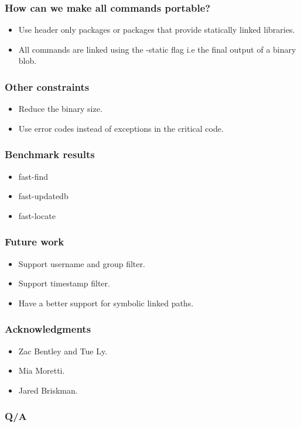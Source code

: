 \documentclass[bigger]{beamer}
\begin{document}
\begin{frame}
    \frametitle{How can we make all commands portable?}
    \pause
    \begin{itemize}
    \item Use header only packages or packages that provide
        statically linked libraries.
        \pause
    \item All commands are linked using the -static flag i.e the final
        output of a binary blob.
    \end{itemize}
\end{frame}

\begin{frame}
    \frametitle{Other constraints}
    \begin{itemize}
        \pause
    \item Reduce the binary size.
        \pause
    \item Use error codes instead of exceptions in the critical code.
    \end{itemize}
\end{frame}

\begin{frame}
    \frametitle{Benchmark results}
    \begin{itemize}
    \item fast-find
        \pause
    \item fast-updatedb
        \pause
    \item fast-locate
    \end{itemize}
\end{frame}

\begin{frame}
    \frametitle{Future work}
    \begin{itemize}
    \item Support username and group filter.
    \item Support timestamp filter.
    \item Have a better support for symbolic linked paths.
    \end{itemize}
\end{frame}

\begin{frame}
    \frametitle{Acknowledgments}
    \begin{itemize}
    \item Zac Bentley and Tue Ly.
    \item Mia Moretti.
    \item Jared Briskman.
    \end{itemize}
\end{frame}

\begin{frame}
    \frametitle{Q/A}
\end{frame}
\end{document}

